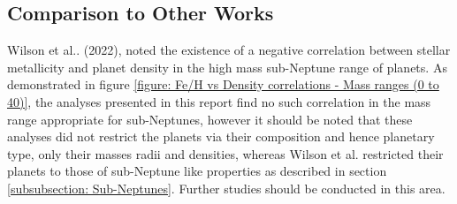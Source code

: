 \documentclass[a4paper,twocolumn,12pt]{article}
\begin{document}




\subsection{Comparison to Other Works}
Wilson et al.. (2022), noted the existence of a negative correlation between stellar metallicity and planet density in the high mass sub-Neptune range of planets. As demonstrated in figure \ref{figure: Fe/H vs Density correlations - Mass ranges (0 to 40)}, the analyses presented in this report find no such correlation in the mass range appropriate for sub-Neptunes, however it should be noted that these analyses did not restrict the planets via their composition and hence planetary type, only their masses radii and densities, whereas Wilson et al. restricted their planets to those of sub-Neptune like properties as described in section \ref{subsubsection: Sub-Neptunes}. Further studies should be conducted in this area.

\end{document}
